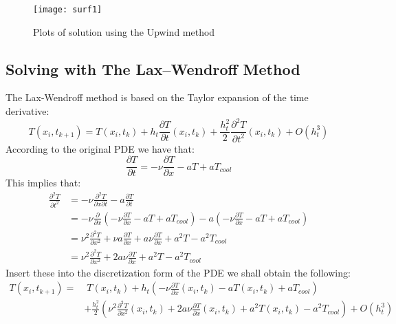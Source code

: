 \documentclass[11pt,a4paper,roman]{scrartcl}
\begin{document}
\begin{figure}[!h]
\centering
\texttt{[image: surf1]}
\caption{Plots of solution using the Upwind method}
\end{figure}

\newpage
\subsection*{Solving with The Lax–Wendroff Method}
The Lax-Wendroff method is based on the Taylor expansion of the time derivative:
\begin{equation}
T(x_i,t_{k+1}) = T(x_i,t_k)+h_t\frac{\partial T}{\partial t}(x_i, t_k) + \frac{h_t^2}{2}\frac{\partial^2 T}{\partial t^2}(x_i, t_k) + O(h_t^3)
\end{equation}
According to the original PDE we have that: 
\begin{equation}
\frac{\partial T}{\partial t} = -\nu\frac{\partial T}{\partial x} - a T + a T_{cool} 
\end{equation}
This implies that: 
\begin{equation}
\begin{aligned}
\frac{\partial^2 T}{\partial t^2} & = -\nu\frac{\partial^2 T}{\partial x \partial t} - a\frac{\partial T}{\partial t} \\
& = -\nu \frac{\partial}{\partial x}(-\nu\frac{\partial T}{\partial x} - a T + a T_{cool} ) - a (-\nu\frac{\partial T}{\partial x} - a T + a T_{cool} ) \\
& = \nu^2 \frac{\partial^2 T}{\partial x^2} + \nu a \frac{\partial T}{\partial x} + a \nu \frac{\partial T}{\partial x} + a^2 T -a^2 T_{cool} \\
& = \nu^2 \frac{\partial^2 T}{\partial x^2} + 2  a \nu \frac{\partial T}{\partial x} + a^2 T -a^2 T_{cool} 
\end{aligned}
\end{equation}
Insert these into the discretization form of the PDE we shall obtain the following: 
\begin{equation}
\begin{aligned}
T(x_i,t_{k+1}) = & \; T(x_i,t_k)  + h_t\left(-\nu\frac{\partial T}{\partial x}(x_i, t_k) - a T(x_i, t_k) + a T_{cool}\right) \\
& + \frac{h_t^2}{2}\left(\nu^2 \frac{\partial^2 T}{\partial x^2}(x_i, t_k) + 2  a \nu \frac{\partial T}{\partial x}(x_i, t_k) + a^2 T(x_i, t_k) -a^2 T_{cool} \right) + O(h_t^3) \\ 
\end{aligned}
\end{equation}
\end{document}
